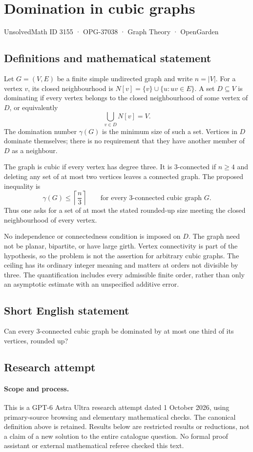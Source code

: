\documentclass[11pt,a4paper]{article}
\begin{document}
\section*{Domination in cubic graphs}\label{3155}
{\small UnsolvedMath ID 3155 · OPG-37038 · Graph Theory · OpenGarden}
\subsection{Definitions and mathematical statement}
Let $G=(V,E)$ be a finite simple undirected graph and write
$n=|V|$. For a vertex $v$, its closed neighbourhood is
$N[v]=\{v\}\cup\{u:uv\in E\}$. A set $D\subseteq V$ is dominating
if every vertex belongs to the closed neighbourhood of some vertex
of $D$, or equivalently
\[
 \bigcup_{v\in D}N[v]=V.
\]
The domination number $\gamma(G)$ is the minimum size of such a
set. Vertices in $D$ dominate themselves; there is no requirement
that they have another member of $D$ as a neighbour.

The graph is cubic if every vertex has degree three. It is
$3$-connected if $n\geq4$ and deleting any set of at most two
vertices leaves a connected graph. The proposed inequality is
\[
 \gamma(G)\leq\left\lceil\frac n3\right\rceil
 \qquad\text{for every $3$-connected cubic graph }G.
\]
Thus one asks for a set of at most the stated rounded-up size
meeting the closed neighbourhood of every vertex.

No independence or connectedness condition is imposed on $D$.
The graph need not be planar, bipartite, or have large girth.
Vertex connectivity is part of the hypothesis, so the problem
is not the assertion for arbitrary cubic graphs. The ceiling
has its ordinary integer meaning and matters at orders not
divisible by three. The quantification includes every admissible
finite order, rather than only an asymptotic estimate with an
unspecified additive error.
\subsection{Short English statement}
Can every 3-connected cubic graph be dominated by at most one third of its vertices, rounded up?
\subsection{Research attempt}
\paragraph{Scope and process.}
This is a GPT-6 Astra Ultra research attempt dated 1 October 2026, using
primary-source browsing and elementary mathematical checks. The canonical
definition above is retained. Results below are restricted results or
reductions, not a claim of a new solution to the entire catalogue question.
No formal proof assistant or external mathematical referee checked this text.
\end{document}
